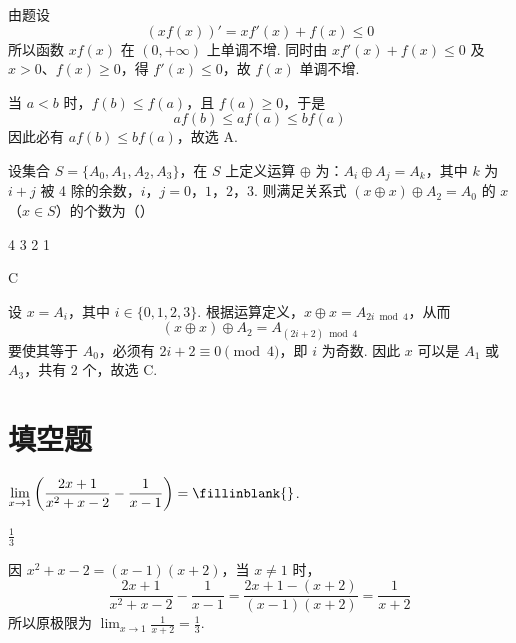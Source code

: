 \begin{solution}
由题设
\[
(xf(x))'=xf'(x)+f(x)\leqslant0
\]
所以函数 \(xf(x)\) 在 \((0,+\infty)\) 上单调不增. 同时由 \(xf'(x)+f(x)\leqslant0\) 及 \(x>0\)、\(f(x)\geqslant0\)，得 \(f'(x)\leqslant0\)，故 \(f(x)\) 单调不增.

当 \(a<b\) 时，\(f(b)\leqslant f(a)\)，且 \(f(a)\geqslant0\)，于是
\[
a f(b)\leqslant a f(a)\leqslant b f(a)
\]
因此必有 \(a f(b)\leqslant b f(a)\)，故选 A.
\end{solution}

\begin{problem}
设集合 \(S = \{A_0, A_1, A_2, A_3\}\)，在 \(S\) 上定义运算 \(\oplus\) 为：\(A_i \oplus A_j = A_k\)，其中 \(k\) 为 \(i + j\) 被 4 除的余数，\(i\)，\(j = 0\)，\(1\)，\(2\)，\(3\). 则满足关系式 \((x \oplus x) \oplus A_2 = A_0\) 的 \(x\)（\(x \in S\)）的个数为（\quad）

\choices
    {4}
    {3}
    {2}
    {1}
\end{problem}

\begin{answer}
C
\end{answer}

\begin{solution}
设 \(x=A_i\)，其中 \(i\in\{0,1,2,3\}\). 根据运算定义，\(x\oplus x=A_{2i\bmod4}\)，从而
\[
(x\oplus x)\oplus A_2=A_{(2i+2)\bmod4}
\]
要使其等于 \(A_0\)，必须有 \(2i+2\equiv0\pmod4\)，即 \(i\) 为奇数. 因此 \(x\) 可以是 \(A_1\) 或 \(A_3\)，共有 \(2\) 个，故选 C.
\end{solution}

\section{填空题}

\begin{problem}
\(\displaystyle\lim_{x\to 1}\left(\frac{2x + 1}{x^2 + x - 2} -\frac{1}{x - 1}\right) =\fillinblank{}\).
\end{problem}

\begin{answer}
\(\frac{1}{3}\)
\end{answer}

\begin{solution}
因 \(x^2+x-2=(x-1)(x+2)\)，当 \(x\neq1\) 时，
\[
\frac{2x+1}{x^2+x-2}-\frac{1}{x-1}=\frac{2x+1-(x+2)}{(x-1)(x+2)}=\frac{1}{x+2}
\]
所以原极限为 \(\displaystyle\lim_{x\to1}\frac1{x+2}=\frac13\).
\end{solution}

